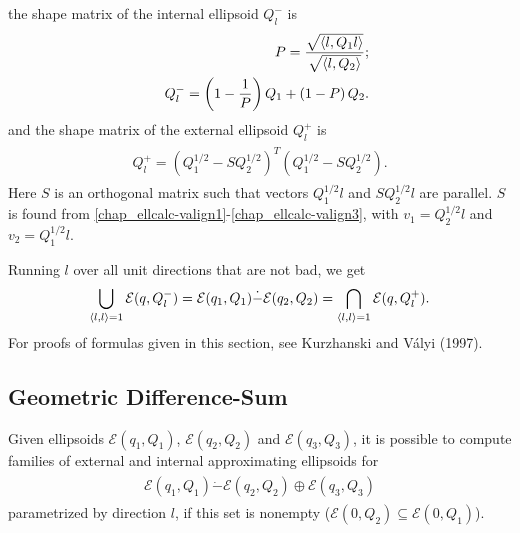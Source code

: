 \documentclass[letterpaper,10pt,english]{sphinxmanual}
\begin{document}
the shape matrix of the internal ellipsoid $Q^-_l$ is
\begin{gather}
\begin{split}\begin{aligned}
&& P = \frac{\sqrt{\langle l, Q_1 l\rangle}}{\sqrt{\langle l, Q_2 \rangle}};\nonumber\\
&& Q^-_l = \left(1 - \dfrac{1}{P}\right)Q_1 + \left(1 - P\right)Q_2.
\label{minkdiff_ia}\end{aligned}\end{split}\notag
\end{gather}
and the shape matrix of the external ellipsoid $Q^+_l$ is
\label{chap_ellcalc:equation-minkdiff_ea}\begin{gather}
\begin{split}Q^+_l = \left(Q_1^{1/2} - SQ_2^{1/2}\right)^T
\left(Q_1^{1/2} - SQ_2^{1/2}\right).\end{split}\label{chap_ellcalc-minkdiff_ea}
\end{gather}
Here $S$ is an orthogonal matrix such that vectors
$Q_1^{1/2}l$ and $SQ_2^{1/2}l$ are parallel. $S$ is
found from \eqref{chap_ellcalc-valign1}-\eqref{chap_ellcalc-valign3}, with $v_1=Q_2^{1/2}l$ and
$v_2=Q_1^{1/2}l$.

Running $l$ over all unit directions that are not bad, we get
\begin{gather}
\begin{split}\bigcup_{\langle l,l\rangle=1} {\mathcal E}(q,Q_l^-) =
{\mathcal E}(q_1,Q_1)\dot{-}{\mathcal E}(q_2,Q_2) =
\bigcap_{\langle l,l\rangle=1} {\mathcal E}(q,Q_l^+) .\end{split}\notag
\end{gather}
For proofs of formulas given in this section, see Kurzhanski and Vályi
(1997).


\subsection{Geometric Difference-Sum}
\label{chap_ellcalc:geometric-difference-sum}
Given ellipsoids ${\mathcal E}(q_1,Q_1)$,
${\mathcal E}(q_2,Q_2)$ and ${\mathcal E}(q_3,Q_3)$, it is
possible to compute families of external and internal approximating
ellipsoids for
\label{chap_ellcalc:equation-minkmp}\begin{gather}
\begin{split}{\mathcal E}(q_1,Q_1) \dot{-} {\mathcal E}(q_2,Q_2) \oplus {\mathcal E}(q_3,Q_3)\end{split}\label{chap_ellcalc-minkmp}
\end{gather}
parametrized by direction $l$, if this set is nonempty
(${\mathcal E}(0,Q_2)\subseteq{\mathcal E}(0,Q_1)$).
\end{document}
